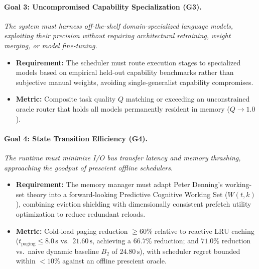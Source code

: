 \paragraph{Goal 3: Uncompromised Capability Specialization (G3).}
\textit{The system must harness off-the-shelf domain-specialized language models, exploiting their precision without requiring architectural retraining, weight merging, or model fine-tuning.}
\begin{itemize}
    \item \textbf{Requirement:} The scheduler must route execution stages to specialized models based on empirical held-out capability benchmarks rather than subjective manual weights, avoiding single-generalist capability compromises.
    \item \textbf{Metric:} Composite task quality $Q$ matching or exceeding an unconstrained oracle router that holds all models permanently resident in memory ($Q \to 1.0$).
\end{itemize}

\paragraph{Goal 4: State Transition Efficiency (G4).}
\textit{The runtime must minimize I/O bus transfer latency and memory thrashing, approaching the goodput of prescient offline schedulers.}
\begin{itemize}
    \item \textbf{Requirement:} The memory manager must adapt Peter Denning's working-set theory into a forward-looking Predictive Cognitive Working Set ($W(t, k)$), combining eviction shielding with dimensionally consistent prefetch utility optimization to reduce redundant reloads.
    \item \textbf{Metric:} Cold-load paging reduction $\ge 60\%$ relative to reactive LRU caching ($t_{\text{paging}} \le 8.0\,\text{s}$ vs.\ $21.60\,\text{s}$, achieving a $66.7\%$ reduction; and $71.0\%$ reduction vs.\ naive dynamic baseline $B_2$ of $24.80\,\text{s}$), with scheduler regret bounded within $< 10\%$ against an offline prescient oracle.
\end{itemize}
